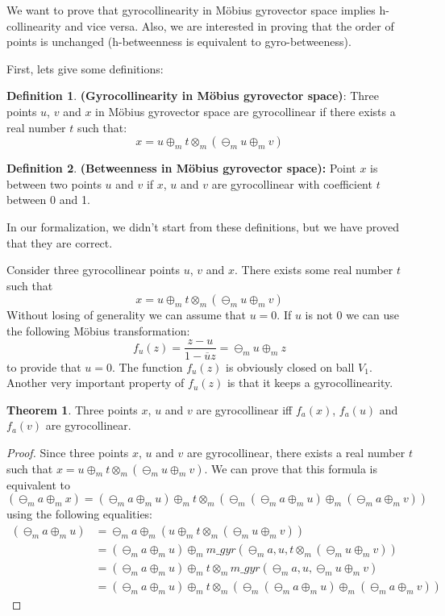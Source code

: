 \documentclass[a4paper]{article}
\theoremstyle{definition}
\newtheorem{definition}{Definition}[section]
\newtheorem{theorem}{Theorem}[section]
\begin{document}
We want to prove that gyrocollinearity in M\" obius gyrovector space implies h-collinearity and vice versa. Also, we are interested in proving that the order of points is unchanged (h-betweenness is equivalent to gyro-betweeness).

First, lets give some definitions:

\begin{definition}\textbf{(Gyrocollinearity in M\" obius gyrovector space)}: Three points $u$, $v$ and $x$ in M\" obius gyrovector space are gyrocollinear if there exists a real number $t$ such that:
$$x = u\oplus_m t \otimes_m (\ominus_m u \oplus_m v)$$
\end{definition}

\begin{definition}\textbf{(Betweenness in M\" obius gyrovector space):} Point $x$ is between two points $u$ and $v$ if $x$, $u$ and $v$ are gyrocollinear with coefficient $t$ between 0 and 1.
\end{definition}

In our formalization, we didn't start from these definitions, but we have proved that they are correct.

Consider three gyrocollinear points $u$, $v$ and $x$. There exists some real number $t$ such that $$x=u\oplus_m t\otimes_m (\ominus_m u \oplus_m v)$$
Without losing of generality we can assume that $u=0$. If $u$ is not $0$ we can use the following M\" obius transformation:
$$f_u(z) = \frac{z-u}{1-\overline{u}z}=\ominus_m u \oplus_m z$$ to provide that $u=0$. The function $f_u(z)$ is obviously closed on ball $V_1$.
Another very important property of $f_u(z)$ is that it keeps a gyrocollinearity.

\begin{theorem}
Three points $x$, $u$ and $v$ are gyrocollinear iff $f_a(x)$, $f_a(u)$ and $f_a(v)$ are gyrocollinear.
\end{theorem}
\begin{proof} Since three points $x$, $u$ and $v$ are gyrocollinear, there exists a real number $t$ such that $x=u\oplus_m t\otimes_m (\ominus_m u \oplus_m v)$. We can prove that this formula is equivalent to $$(\ominus_m a \oplus_m x) = (\ominus_m a \oplus_m u) \oplus_m t \otimes_m (\ominus_m (\ominus_m a \oplus_m u) \oplus_m (\ominus_m a \oplus_m v))$$
using the following equalities:
\begin{align*} 
(\ominus_m a \oplus_m u) &=  \ominus_m a \oplus_m (u\oplus_m t \otimes_m (\ominus_m u \oplus_m v)) \\ 
 &=  (\ominus_m a \oplus_m u) \oplus_m m\_gyr (\ominus_m a, u, t\otimes_m (\ominus_m u \oplus_m v))\\
 &= (\ominus_m a \oplus_m u) \oplus_m t \otimes_m m\_gyr(\ominus_m a, u, \ominus_m u \oplus_m v)\\
 &= (\ominus_m a \oplus_m u) \oplus_m t \otimes_m (\ominus_m (\ominus_m a \oplus_m u) \oplus_m (\ominus_m a \oplus_m v))
\end{align*}
\end{proof}
\end{document}
